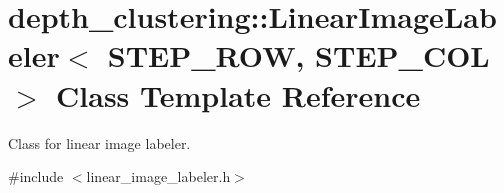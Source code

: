 \hypertarget{classdepth__clustering_1_1LinearImageLabeler}{}\section{depth\+\_\+clustering\+:\+:Linear\+Image\+Labeler$<$ S\+T\+E\+P\+\_\+\+R\+OW, S\+T\+E\+P\+\_\+\+C\+OL $>$ Class Template Reference}
\label{classdepth__clustering_1_1LinearImageLabeler}


Class for linear image labeler.  




{\ttfamily \#include $<$linear\+\_\+image\+\_\+labeler.\+h$>$}

